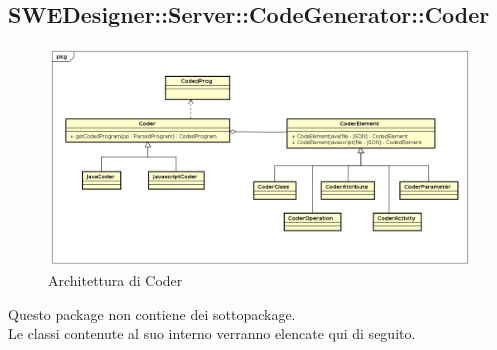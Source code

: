 \documentclass[../DefinizioneDiProdotto.tex]{subfiles}
\begin{document}
			\subsection{SWEDesigner::Server::CodeGenerator::Coder}
			\begin{figure}[H]\label{fig:Coder}
				\centering
				\includegraphics[scale=0.46]{Immagini/DiagrammaArchitettura/Coder.png}
				\caption{Architettura di Coder}
			\end{figure}
			
			Questo package non contiene dei sottopackage.\\
			Le classi contenute al suo interno verranno elencate qui di seguito.
			
			
\end{document}
